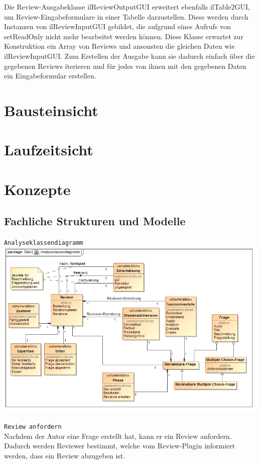 \documentclass[a4paper]{scrreprt}
\begin{document}
Die Review-Ausgabeklasse ilReviewOutputGUI erweitert ebenfalls ilTable2GUI, um Review-Eingabeformulare in einer Tabelle darzustellen. Diese werden durch Instanzen von ilReviewInputGUI gebildet, die aufgrund eines Aufrufs von setReadOnly nicht mehr bearbeitet werden können. Diese Klasse erwartet zur Konstruktion ein Array von Reviews und ansonsten die gleichen Daten wie ilReviewInputGUI. Zum Erstellen der Ausgabe kann sie dadurch einfach über die gegebenen Reviews iterieren und für jedes von ihnen mit den gegebenen Daten ein Eingabeformular erstellen.
\chapter{Bausteinsicht}
\chapter{Laufzeitsicht}
\chapter{Konzepte}
\section{Fachliche Strukturen und Modelle}
\texttt{Analyseklassendiagramm}
\includegraphics[width=1.0\textwidth]{Class_Diagram__Analyseklassendiagramm.png}
\label{Analyseklassendiagramm}

\newpage
\texttt{Review anfordern}\\
Nachdem der Autor eine Frage erstellt hat, kann er ein Review anfordern. Dadurch werden Reviewer bestimmt, welche vom Review-Plugin informiert werden, dass ein Review abzugeben ist.\\
\end{document}
